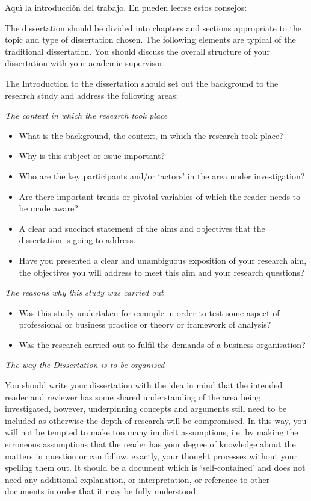  \intro


Aqu\'{\i} la introducci\'on del trabajo. En \cite{guidedissertation} pueden leerse
estos consejos:

The dissertation should be divided into chapters and sections appropriate to
the topic and type of dissertation chosen. The following elements are typical
of the traditional dissertation. You should discuss the overall structure of
your dissertation with your academic supervisor.

The Introduction to the dissertation should set out the background to the
research study and address the following areas:

\medskip
\noindent\textsl{The context in which the research took place}
\begin{itemize}
 \item What is the background, the context, in which the research took place?
 \item Why is this subject or issue important?
 \item Who are the key participants and/or `actors' in the area under investigation?
 \item Are there important trends or pivotal variables of which the reader
       needs to be made aware?
 \item A clear and succinct statement of the aims and objectives that the
       dissertation is going to address.
 \item Have you presented a clear and unambiguous exposition of your research
       aim, the objectives you will address to meet this aim and your research
       questions?
\end{itemize}

\medskip
\noindent\textsl{The reasons why this study was carried out}
\begin{itemize}
 \item Was this study undertaken for example in order to test some aspect of
professional or business practice or theory or framework of analysis?
 \item Was the research carried out to fulfil the demands of a business
organisation?
\end{itemize}

\medskip
\noindent\textsl{The way the Dissertation is to be organised}

You should write your dissertation with the idea in mind that the intended reader and
reviewer has some shared understanding of the area being investigated, however,
underpinning concepts and arguments still need to be included as otherwise the depth
of research will be compromised. In this way, you will not be tempted to make too
many implicit assumptions, i.e. by making the erroneous assumptions that the reader
has your degree of knowledge about the matters in question or can follow, exactly,
your thought processes without your spelling them out. It should be a document which
is `self-contained' and does not need any additional explanation, or interpretation, or
reference to other documents in order that it may be fully understood.

